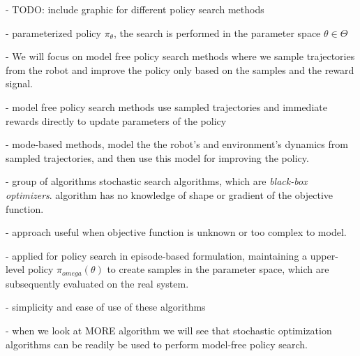 - TODO: include graphic for different policy search methods

- parameterized policy $\pi_{\theta}$, the search is performed in the parameter space
$\theta \in \Theta$

- We will focus on model free policy search methods where we sample trajectories from
the robot and improve the policy only based on the samples and the reward signal.

- model free policy search methods use sampled trajectories and immediate rewards directly
to update parameters of the policy

- mode-based methods, model the the robot's and environment's dynamics from sampled
  trajectories, and then use this model for improving the policy.

- group of algorithms stochastic search algorithms, which are \textit{black-box optimizers}.
algorithm has no knowledge of shape or gradient of the objective function.

- approach useful when objective function is unknown or too complex to model.

- applied for policy search in episode-based formulation, maintaining a upper-level policy
$\pi_{omega}(\theta)$ to create samples in the parameter space, which are
subsequently evaluated on the real system.

- simplicity and ease of use of these algorithms

- when we look at MORE algorithm we will see that stochastic optimization algorithms can
be readily be used to perform model-free policy search.
  
%
%
%
%
%
%

